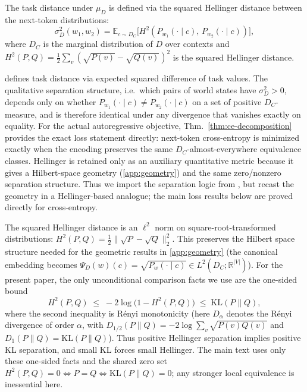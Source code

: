 \documentclass[twoside,11pt]{article}
\newcommand{\sigmasq}{\sigma^2}
\newcommand{\E}{\mathbb{E}}
\newcommand{\R}{\mathbb{R}}
\newcommand{\KL}{\mathrm{KL}}
\newcommand{\Hsq}{H^2}
\newcommand{\thmref}[1]{Thm.~\ref{#1}}
\begin{document}
\begin{definition}\label{def:text-distance}
The task distance under $\mu_D$ is defined via the squared Hellinger distance between the next-token distributions:
\[
\sigmasq_D(w_1, w_2)
= \E_{c \sim D_C}\bigl[\Hsq(P_{w_1}(\cdot\mid c),\, P_{w_2}(\cdot\mid c))\bigr],
\]
where $D_C$ is the marginal distribution of $D$ over contexts and $\Hsq(P, Q) = \tfrac{1}{2} \sum_v (\sqrt{P(v)} - \sqrt{Q(v)})^2$ is the squared Hellinger distance.
\end{definition}

\citet{dallariva_2026} defines task distance via expected squared difference of task values. The qualitative separation structure, i.e.\ which pairs of world states have $\sigmasq_D > 0$, depends only on whether $P_{w_1}(\cdot\mid c) \neq P_{w_2}(\cdot\mid c)$ on a set of positive $D_C$-measure, and is therefore identical under any divergence that vanishes exactly on equality. For the actual autoregressive objective, \thmref{thm:ce-decomposition} provides the exact loss statement directly: next-token cross-entropy is minimized exactly when the encoding preserves the same $D_C$-almost-everywhere equivalence classes. Hellinger is retained only as an auxiliary quantitative metric because it gives a Hilbert-space geometry (\cref{app:geometry}) and the same zero/nonzero separation structure. Thus we import the separation logic from \citet{dallariva_2026}, but recast the geometry in a Hellinger-based analogue; the main loss results below are proved directly for cross-entropy.

The squared Hellinger distance is an $\ell^2$ norm on square-root-transformed distributions: $\Hsq(P,Q) = \tfrac{1}{2}\|\sqrt{P} - \sqrt{Q}\|_2^2$. This preserves the Hilbert space structure needed for the geometric results in \cref{app:geometry} (the canonical embedding becomes $\Psi_D(w)(c) = \sqrt{P_w(\cdot\mid c)} \in L^2(D_C; \R^{|V|})$). For the present paper, the only unconditional comparison facts we use are the one-sided bound
\[
\Hsq(P,Q) \;\le\; -2\log\!\bigl(1 - \Hsq(P,Q)\bigr) \;\le\; \KL(P \| Q),
\]
where the second inequality is R\'{e}nyi monotonicity (here $D_\alpha$ denotes the R\'{e}nyi divergence of order $\alpha$, with $D_{1/2}(P\|Q) = -2\log \sum_v \sqrt{P(v)Q(v)}$ and $D_1(P\|Q)=\KL(P\|Q)$). Thus positive Hellinger separation implies positive KL separation, and small KL forces small Hellinger. The main text uses only these one-sided facts and the shared zero set $\Hsq(P,Q)=0 \Leftrightarrow P=Q \Leftrightarrow \KL(P\|Q)=0$; any stronger local equivalence is inessential here.
\end{document}

